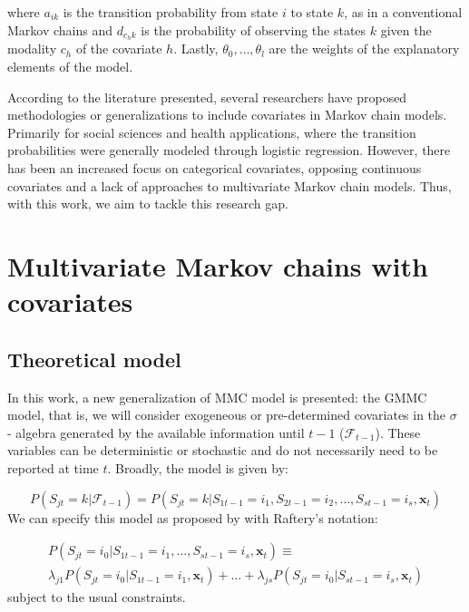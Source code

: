 where \(a_{ik}\) is the transition probability from state \(i\) to state \(k\), as in a conventional Markov chains and \(d_{c_{h}k}\) is the probability of observing the states \(k\) given the modality \(c_h\) of the covariate \(h\). Lastly, \(\theta_0, \dots, \theta_l\) are the weights of the explanatory elements of the model.

According to the literature presented, several researchers have proposed methodologies or generalizations to include covariates in Markov chain models. Primarily for social sciences and health applications, where the transition probabilities were generally modeled through logistic regression. However, there has been an increased focus on categorical covariates, opposing continuous covariates and a lack of approaches to multivariate Markov chain models. Thus, with this work, we aim to tackle this research gap.

\section{Multivariate Markov chains with covariates}\label{multivariate-markov-chains-with-covariates}

\subsection{Theoretical model}\label{theoretical-model}

In this work, a new generalization of \citet{Ching2002} MMC model is presented: the GMMC model, that is, we will consider exogeneous or pre-determined covariates in the \(\sigma\) - algebra generated by the available information until \(t-1\) (\(\mathcal{F}_{t-1}\)). These variables can be deterministic or stochastic and do not necessarily need to be reported at time \(t\). Broadly, the model is given by:

\begin{equation}
P(S_{jt} = k | \mathcal{ F}_{t-1} ) = P(S_{jt} =  k | S_{1t-1} = i_1, S_{2t-1} = i_2, \dots, S_{st-1} = i_s, \boldsymbol{x}_t) \label{eq:eq8}
\end{equation} We can specify this model as proposed by \citet{Ching2002} with Raftery's notation:

\begin{multline}
P(S_{jt} =  i_0 | S_{1t-1} = i_1,\dots, S_{st-1} = i_s, \boldsymbol{x}_t) \equiv \\
\lambda_{j1}P(S_{jt} =  i_0 | S_{1t-1} = i_1,\boldsymbol{x}_t) + \dots + \lambda_{js}P(S_{jt} =  i_0 | S_{st-1} = i_s, \boldsymbol{x}_t) \label{eq:eq9}
\end{multline} subject to the usual constraints.

